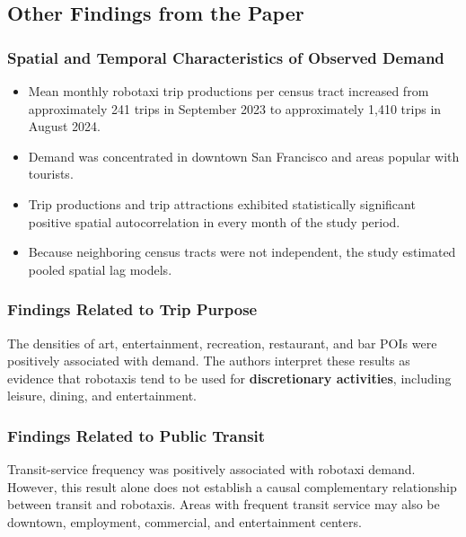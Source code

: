 \documentclass[10pt,a4paper]{article}
\providecommand{\tightlist}{\setlength{\itemsep}{0pt}\setlength{\parskip}{0pt}}
\begin{document}
\hypertarget{other-findings-from-the-paper}{%
\subsection{Other Findings from the Paper}\label{other-findings-from-the-paper}}

\hypertarget{spatial-and-temporal-characteristics-of-observed-demand}{%
\subsubsection{Spatial and Temporal Characteristics of Observed Demand}\label{spatial-and-temporal-characteristics-of-observed-demand}}

\begin{itemize}
\tightlist
\item
  Mean monthly robotaxi trip productions per census tract increased from approximately 241 trips in September 2023 to approximately 1,410 trips in August 2024.
\item
  Demand was concentrated in downtown San Francisco and areas popular with tourists.
\item
  Trip productions and trip attractions exhibited statistically significant positive spatial autocorrelation in every month of the study period.
\item
  Because neighboring census tracts were not independent, the study estimated pooled spatial lag models.
\end{itemize}

\hypertarget{findings-related-to-trip-purpose}{%
\subsubsection{Findings Related to Trip Purpose}\label{findings-related-to-trip-purpose}}

The densities of art, entertainment, recreation, restaurant, and bar POIs were positively associated with demand. The authors interpret these results as evidence that robotaxis tend to be used for \textbf{discretionary activities}, including leisure, dining, and entertainment.

\hypertarget{findings-related-to-public-transit}{%
\subsubsection{Findings Related to Public Transit}\label{findings-related-to-public-transit}}

Transit-service frequency was positively associated with robotaxi demand. However, this result alone does not establish a causal complementary relationship between transit and robotaxis. Areas with frequent transit service may also be downtown, employment, commercial, and entertainment centers.
\end{document}
